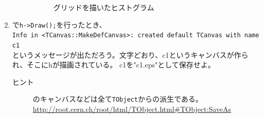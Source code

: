\begin{enumerate}
\begin{description}
\begin{figure}[htbp]
\begin{center}
		      \end{center}
		      \caption{グリッドを描いたヒストグラム}
		      \label{Fig:hist1canvas2}
		     \end{figure}
	 \end{description}
   \item \ROOT で\verb|h->Draw();|を行ったとき、 \\
	 \verb|Info in <TCanvas::MakeDefCanvas>: created default TCanvas with name c1| \\
	 というメッセージが出ただろう。文字どおり、c1というキャンバスが作られ、そこにhが描画されている。
	 c1を"c1.eps"として保存せよ。
	 \begin{description}
	  \item[ヒント] \ROOT のキャンバスなどは全て\verb|TObject|からの派生である。\\
		     \url{http://root.cern.ch/root/html/TObject.html#TObject:SaveAs}
	 \end{description}

  \end{enumerate}

